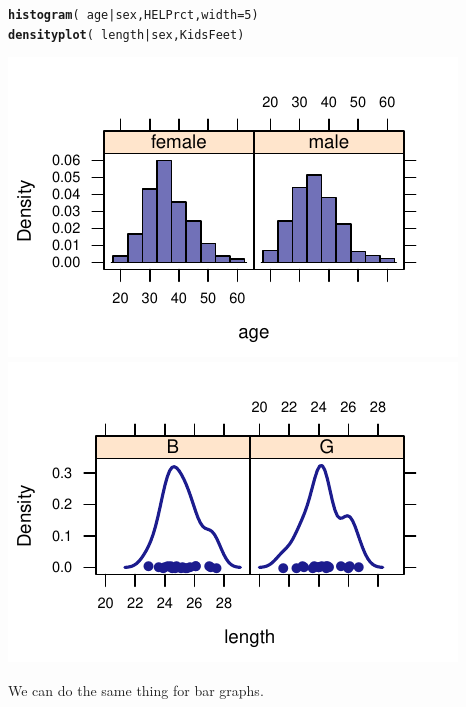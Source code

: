 \documentclass[twoside]{book}\usepackage[]{graphicx}\usepackage[]{xcolor}
\makeatletter
\def\maxwidth{ %
  \ifdim\Gin@nat@width>\linewidth
    \linewidth
  \else
    \Gin@nat@width
  \fi
}
\newcommand{\hlnum}[1]{\textcolor[rgb]{0.686,0.059,0.569}{#1}}%
\newcommand{\hlopt}[1]{\textcolor[rgb]{0,0,0}{#1}}%
\newcommand{\hlstd}[1]{\textcolor[rgb]{0.345,0.345,0.345}{#1}}%
\newcommand{\hlkwc}[1]{\textcolor[rgb]{0.333,0.667,0.333}{#1}}%
\newcommand{\hlkwd}[1]{\textcolor[rgb]{0.737,0.353,0.396}{\textbf{#1}}}%
\newenvironment{kframe}{%
 \def\at@end@of@kframe{}%
 \ifinner\ifhmode%
  \def\at@end@of@kframe{\end{minipage}}%
  \begin{minipage}{\columnwidth}%
 \fi\fi%
 \def\FrameCommand##1{\hskip\@totalleftmargin \hskip-\fboxsep
 \colorbox{shadecolor}{##1}\hskip-\fboxsep
     \hskip-\linewidth \hskip-\@totalleftmargin \hskip\columnwidth}%
 \MakeFramed {\advance\hsize-\width
   \@totalleftmargin\z@ \linewidth\hsize
   \@setminipage}}%
 {\par\unskip\endMakeFramed%
 \at@end@of@kframe}
\newenvironment{knitrout}{}{} %
\makeatother
\begin{document}
\begin{knitrout}
\color{fgcolor}\begin{kframe}
\begin{alltt}
\hlkwd{histogram}\hlstd{(} \hlopt{~} \hlstd{age} \hlopt{|} \hlstd{sex, HELPrct,} \hlkwc{width}\hlstd{=}\hlnum{5}\hlstd{)}
\hlkwd{densityplot}\hlstd{(} \hlopt{~} \hlstd{length} \hlopt{|} \hlstd{sex, KidsFeet )}
\end{alltt}
\end{kframe}

{\centering \includegraphics[width=\maxwidth]{figures/fig-compare-ages-1} 
\includegraphics[width=\maxwidth]{figures/fig-compare-ages-2} 

}



\end{knitrout}


We can do the same thing for bar graphs.
\end{document}
